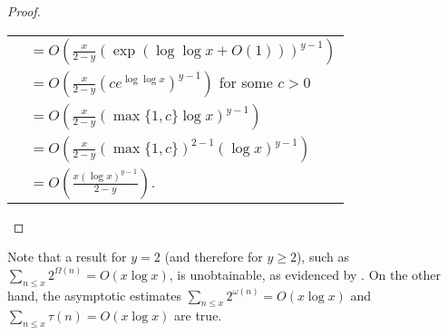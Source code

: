 \documentclass[12pt]{article}
\begin{document}
\begin{proof}
\begin{center}
\begin{tabular}{ll}
& $\displaystyle =O\left( \frac{x}{2-y} \left( \exp \left( \log\log x+O(1) \right) \right)^{y-1} \right)$ \\
& $\displaystyle =O\left( \frac{x}{2-y} \left(ce^{\log\log x} \right)^{y-1} \right)$ for some $c>0$ \\
& $\displaystyle =O\left( \frac{x}{2-y} \left(\max\{1,c\}\log x\right)^{y-1} \right)$ \\
& $\displaystyle =O\left( \frac{x}{2-y} \left(\max\{1,c\}\right)^{2-1} \left( \log x \right)^{y-1} \right)$ \\
& $\displaystyle =O\left( \frac{x \left( \log x \right)^{y-1}}{2-y} \right)$. \end{tabular}
\end{center}
\end{proof}

Note that a  result for $y=2$ (and therefore for $y \ge 2$), such as $\displaystyle \sum_{n \le x} 2^{\Omega(n)}=O(x\log x)$, is unobtainable, as evidenced by .  On the other hand, the asymptotic estimates $\displaystyle \sum_{n \le x} 2^{\omega(n)}=O(x\log x)$ and $\displaystyle \sum_{n \le x} \tau(n)=O(x\log x)$ are true.
\end{document}
